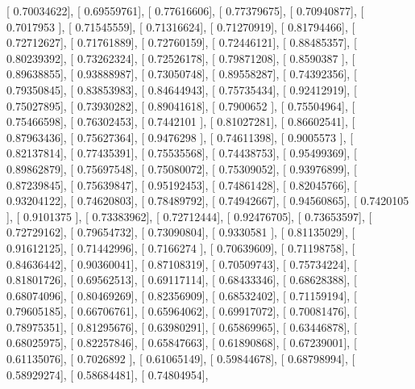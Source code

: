 \documentclass{article}
\begin{document}
       [ 0.70034622],
       [ 0.69559761],
       [ 0.77616606],
       [ 0.77379675],
       [ 0.70940877],
       [ 0.7017953 ],
       [ 0.71545559],
       [ 0.71316624],
       [ 0.71270919],
       [ 0.81794466],
       [ 0.72712627],
       [ 0.71761889],
       [ 0.72760159],
       [ 0.72446121],
       [ 0.88485357],
       [ 0.80239392],
       [ 0.73262324],
       [ 0.72526178],
       [ 0.79871208],
       [ 0.8590387 ],
       [ 0.89638855],
       [ 0.93888987],
       [ 0.73050748],
       [ 0.89558287],
       [ 0.74392356],
       [ 0.79350845],
       [ 0.83853983],
       [ 0.84644943],
       [ 0.75735434],
       [ 0.92412919],
       [ 0.75027895],
       [ 0.73930282],
       [ 0.89041618],
       [ 0.7900652 ],
       [ 0.75504964],
       [ 0.75466598],
       [ 0.76302453],
       [ 0.7442101 ],
       [ 0.81027281],
       [ 0.86602541],
       [ 0.87963436],
       [ 0.75627364],
       [ 0.9476298 ],
       [ 0.74611398],
       [ 0.9005573 ],
       [ 0.82137814],
       [ 0.77435391],
       [ 0.75535568],
       [ 0.74438753],
       [ 0.95499369],
       [ 0.89862879],
       [ 0.75697548],
       [ 0.75080072],
       [ 0.75309052],
       [ 0.93976899],
       [ 0.87239845],
       [ 0.75639847],
       [ 0.95192453],
       [ 0.74861428],
       [ 0.82045766],
       [ 0.93204122],
       [ 0.74620803],
       [ 0.78489792],
       [ 0.74942667],
       [ 0.94560865],
       [ 0.7420105 ],
       [ 0.9101375 ],
       [ 0.73383962],
       [ 0.72712444],
       [ 0.92476705],
       [ 0.73653597],
       [ 0.72729162],
       [ 0.79654732],
       [ 0.73090804],
       [ 0.9330581 ],
       [ 0.81135029],
       [ 0.91612125],
       [ 0.71442996],
       [ 0.7166274 ],
       [ 0.70639609],
       [ 0.71198758],
       [ 0.84636442],
       [ 0.90360041],
       [ 0.87108319],
       [ 0.70509743],
       [ 0.75734224],
       [ 0.81801726],
       [ 0.69562513],
       [ 0.69117114],
       [ 0.68433346],
       [ 0.68628388],
       [ 0.68074096],
       [ 0.80469269],
       [ 0.82356909],
       [ 0.68532402],
       [ 0.71159194],
       [ 0.79605185],
       [ 0.66706761],
       [ 0.65964062],
       [ 0.69917072],
       [ 0.70081476],
       [ 0.78975351],
       [ 0.81295676],
       [ 0.63980291],
       [ 0.65869965],
       [ 0.63446878],
       [ 0.68025975],
       [ 0.82257846],
       [ 0.65847663],
       [ 0.61890868],
       [ 0.67239001],
       [ 0.61135076],
       [ 0.7026892 ],
       [ 0.61065149],
       [ 0.59844678],
       [ 0.68798994],
       [ 0.58929274],
       [ 0.58684481],
       [ 0.74804954],
\end{document}
